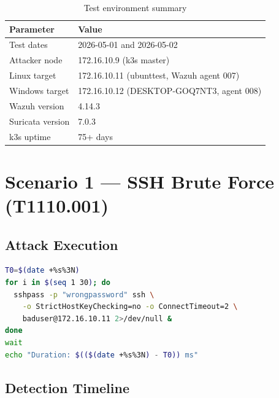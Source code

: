 \documentclass[12pt,a4paper]{report}
\begin{document}
\begin{table}[H]
\centering
\caption{Test environment summary}
\begin{tabular}{ll}
\toprule
\textbf{Parameter} & \textbf{Value} \\
\midrule
Test dates       & 2026-05-01 and 2026-05-02 \\
Attacker node    & 172.16.10.9 (k3s master) \\
Linux target     & 172.16.10.11 (ubunttest, Wazuh agent 007) \\
Windows target   & 172.16.10.12 (DESKTOP-GOQ7NT3, agent 008) \\
Wazuh version    & 4.14.3 \\
Suricata version & 7.0.3 \\
k3s uptime       & 75+ days \\
\bottomrule
\end{tabular}
\label{tab:testenv}
\end{table}

\section{Scenario 1 --- SSH Brute Force (T1110.001)}

\subsection{Attack Execution}

\begin{lstlisting}[language=bash, caption=SSH brute force attack (30 parallel attempts)]
T0=$(date +%s%3N)
for i in $(seq 1 30); do
  sshpass -p "wrongpassword" ssh \
    -o StrictHostKeyChecking=no -o ConnectTimeout=2 \
    baduser@172.16.10.11 2>/dev/null &
done
wait
echo "Duration: $(($(date +%s%3N) - T0)) ms"
\end{lstlisting}

\subsection{Detection Timeline}
\end{document}
